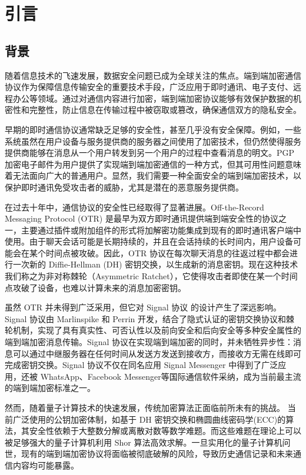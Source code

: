 \chapter{引言}\label{chap:introduction}

\section{背景}

随着信息技术的飞速发展，数据安全问题已成为全球关注的焦点。端到端加密通信协议作为保障信息传输安全的重要技术手段，广泛应用于即时通讯、电子支付、远程办公等领域。通过对通信内容进行加密，端到端加密协议能够有效保护数据的机密性和完整性，防止信息在传输过程中被窃取或篡改，确保通信双方的隐私安全。


早期的即时通信协议通常缺乏足够的安全性，甚至几乎没有安全保障。例如，一些系统虽然在用户设备与服务提供商的服务器之间使用了加密技术，但仍然使得服务提供商能够在消息从一个用户转发到另一个用户的过程中查看消息的明文。PGP加密电子邮件\cite{zimmermann1995official}为用户提供了实现端到端加密通信的一种方式，但其可用性问题意味着无法面向广大的普通用户。显然，我们需要一种全面安全的端到端加密技术，以保护即时通讯免受攻击者的威胁，尤其是潜在的恶意服务提供商。

在过去十年中，通信协议的安全性已经取得了显著进展。Off-the-Record Messaging Protocol (OTR) \cite{borisov2004off} 是最早为双方即时通讯提供端到端安全性的协议之一，主要通过插件或附加组件的形式将加解密功能集成到现有的即时通讯客户端中使用。由于聊天会话可能是长期持续的，并且在会话持续的长时间内，用户设备可能会在某个时间点被攻破。因此，OTR 协议在每次聊天消息的往返过程中都会进行一次新的 Diffie-Hellman (DH) 密钥交换，以生成新的消息密钥。现在这种技术我们称之为非对称棘轮（Asymmetric Ratchet），它使得攻击者即使在某一个时间点攻破了设备，也难以计算未来的消息加密密钥。

虽然 OTR 并未得到广泛采用，但它对 Signal 协议 \cite{signal_docs} 的设计产生了深远影响。Signal 协议由 Marlinspike 和 Perrin 开发，结合了隐式认证的密钥交换协议和棘轮机制，实现了具有真实性、可否认性以及前向安全和后向安全等多种安全属性的端到端加密消息传输。Signal 协议在实现端到端加密的同时，并未牺牲异步性：消息可以通过中继服务器在任何时间从发送方发送到接收方，而接收方无需在线即可完成密钥交换。Signal 协议不仅在同名应用 Signal Messenger 中得到了广泛应用，还被 WhatsApp、Facebook Messenger等国际通信软件采纳，成为当前最主流的端到端加密标准之一。

然而，随着量子计算技术的快速发展，传统加密算法正面临前所未有的挑战。 当前广泛使用的公钥加密体制，如基于 DH 密钥交换和椭圆曲线密码学(ECC)的算法，其安全性依赖于大整数分解或离散对数等数学难题。而这些难题在理论上可以被足够强大的量子计算机利用 Shor 算法\cite{shor1994algorithms}高效求解。一旦实用化的量子计算机问世，现有的端到端加密协议将面临被彻底破解的风险，导致历史通信记录和未来通信内容均可能暴露。



